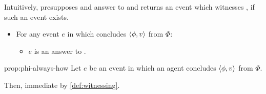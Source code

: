 \begin{note}
  Intuitively, \qHowV{} presupposes and answer to \qWhyV{} and returns an event which witnesses \ros{}, if such an event exists.
\end{note}

\begin{note}
  \begin{proposition}
    \label{prop:phi-always-how}

    \begin{itemize}
    \item
      For any event \(e\) in which \vAgent{} concludes \(\langle \phi, v \rangle\) from \(\Phi\):
      \begin{itemize}
      \item
        \(e\) is an answer to \qHowV{}.
      \end{itemize}
    \end{itemize}
    \vspace{-\baselineskip}
  \end{proposition}

  \begin{argument}{prop:phi-always-how}
    Let \(e\) be an event in which an agent concludes \(\langle \phi, v \rangle\) from \(\Phi\).

    Then, immediate by \autoref{def:witnessing}.
  \end{argument}




\end{note}


